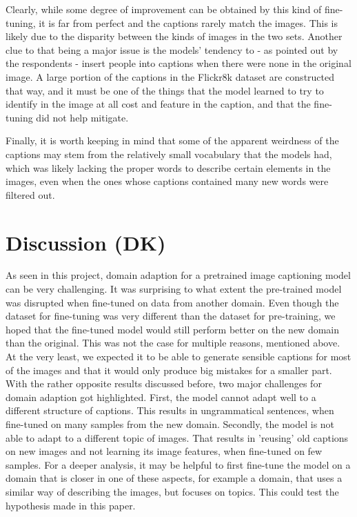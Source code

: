 \documentclass[11pt]{article}
\begin{document}
Clearly, while some degree of improvement can be obtained by this kind of fine-tuning, it is far from perfect and the captions rarely match the images. This is likely due to the disparity between the kinds of images in the two sets. Another clue to that being a major issue is the models' tendency to - as pointed out by the respondents - insert people into captions when there were none in the original image. A large portion of the captions in the Flickr8k dataset are constructed that way, and it must be one of the things that the model learned to try to identify in the image at all cost and feature in the caption, and that the fine-tuning did not help mitigate.

Finally, it is worth keeping in mind that some of the apparent weirdness of the captions may stem from the relatively small vocabulary that the models had, which was likely lacking the proper words to describe certain elements in the images, even when the ones whose captions contained many new words were filtered out.

\section{Discussion (DK)}

As seen in this project, domain adaption for a pretrained image captioning model can be very challenging. It was surprising to what extent the pre-trained model was disrupted when fine-tuned on data from another domain. Even though the dataset for fine-tuning was very different than the dataset for pre-training, we hoped that the fine-tuned model would still perform better on the new domain than the original. This was not the case for multiple reasons, mentioned above. At the very least, we expected it to be able to generate sensible captions for most of the images and that it would only produce big mistakes for a smaller part. With the rather opposite results discussed before, two major challenges for domain adaption got highlighted. First, the model cannot adapt well to a different structure of captions. This results in ungrammatical sentences, when fine-tuned on many samples from the new domain. Secondly, the model is not able to adapt to a different topic of images. That results in 'reusing' old captions on new images and not learning its image features, when fine-tuned on few samples. For a deeper analysis, it may be helpful to first fine-tune the model on a domain that is closer in one of these aspects, for example a domain, that uses a similar way of describing the images, but focuses on topics. This could test the hypothesis made in this paper.
\end{document}
